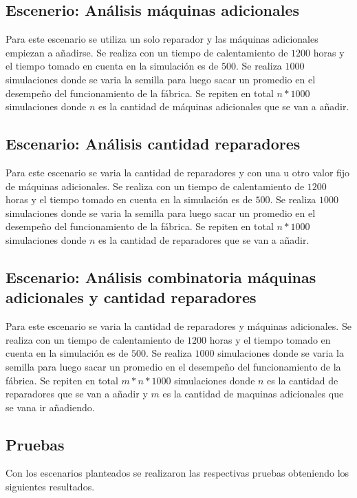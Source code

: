 \documentclass[12pt]{article}
\begin{document}
\subsection{Escenerio: An\'alisis m\'aquinas adicionales}

Para este escenario se utiliza un solo reparador y las máquinas adicionales empiezan a añadirse. Se realiza con un tiempo de calentamiento de $1200$ horas y el tiempo tomado en cuenta en la simulación es de $500$. Se realiza $1000$ simulaciones donde se varia la semilla para luego sacar un promedio en el desempeño del funcionamiento de la fábrica. Se repiten en total $n*1000$ simulaciones donde $n$ es la cantidad de máquinas adicionales que se van a añadir.

\subsection{Escenario: An\'alisis cantidad reparadores}

Para este escenario se varia la cantidad de reparadores y con una u otro valor fijo de máquinas adicionales. Se realiza con un tiempo de calentamiento de $1200$ horas y el tiempo tomado en cuenta en la simulación es de $500$. Se realiza $1000$ simulaciones donde se varia la semilla para luego sacar un promedio en el desempeño del funcionamiento de la fábrica. Se repiten en total $n*1000$ simulaciones donde $n$ es la cantidad de reparadores que se van a añadir.

\subsection{Escenario: An\'alisis combinatoria m\'aquinas adicionales y cantidad reparadores}

Para este escenario se varia la cantidad de reparadores y máquinas adicionales. Se realiza con un tiempo de calentamiento de $1200$ horas y el tiempo tomado en cuenta en la simulación es de $500$. Se realiza $1000$ simulaciones donde se varia la semilla para luego sacar un promedio en el desempeño del funcionamiento de la fábrica. Se repiten en total $m*n*1000$ simulaciones donde $n$ es la cantidad de reparadores que se van a añadir y $m$ es la cantidad de maquinas adicionales que se vana ir añadiendo.


\subsection{Pruebas}

Con los escenarios planteados se realizaron las respectivas pruebas obteniendo los siguientes resultados.
\end{document}
